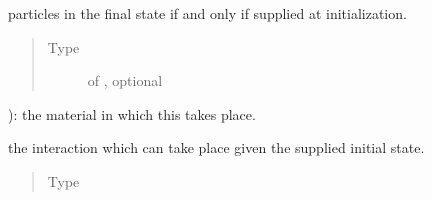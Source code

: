 \documentclass[letterpaper,10pt,english]{sphinxmanual}
\begin{document}
\begin{fulllineitems}
\begin{fulllineitems}
\begin{quote}
\begin{description}
\end{description}\end{quote}

\end{fulllineitems}


\begin{fulllineitems}
\label{\detokenize{code_structure:scdc.event.Event.final_state}}
particles in
the final state if and only if supplied at initialization.
\begin{quote}\begin{description}
\item[{Type}] \leavevmode
{} of , optional

\end{description}\end{quote}

\end{fulllineitems}



\begin{fulllineitems}
): the material in which this takes place.

\end{fulllineitems}


\begin{fulllineitems}
\label{\detokenize{code_structure:scdc.event.Event.interaction}}
the interaction which can take place
given the supplied initial state.
\begin{quote}\begin{description}
\item[{Type}] \leavevmode
{}

\end{description}\end{quote}

\end{fulllineitems}



\end{fulllineitems}
\end{document}
